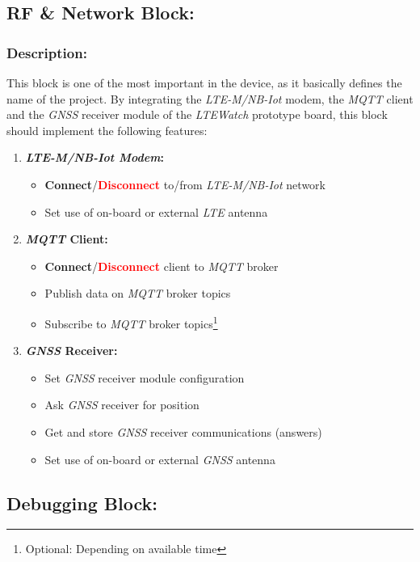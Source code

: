 \documentclass[report.tex]{subfiles}
\begin{document}
\subsection{RF \& Network Block:}
\subsubsection{Description:}
This block is one of the most important in the device, as it basically defines the name of the project. By integrating the \textit{LTE-M/NB-Iot} modem, the \textit{MQTT} client and the \textit{GNSS} receiver module of the \textit{LTEWatch} prototype board, this block should implement the following features:

\begin{enumerate}
\item \textbf{\textit{LTE-M/NB-Iot Modem}:}
\begin{itemize}
\item \textbf{\textcolor{mygreen}{Connect}}/\textbf{\textcolor{red}{Disconnect}} to/from \textit{LTE-M/NB-Iot} network
\item Set use of on-board or external \textit{LTE} antenna
\end{itemize}
\item \textbf{\textit{MQTT} Client:}
\begin{itemize}
\item \textbf{\textcolor{mygreen}{Connect}}/\textbf{\textcolor{red}{Disconnect}} client to \textit{MQTT} broker
\item Publish data on \textit{MQTT} broker topics
\item Subscribe to \textit{MQTT} broker topics\footnote{Optional: Depending on available time}
\end{itemize}
\item \textbf{\textit{GNSS} Receiver:}
\begin{itemize}
\item Set \textit{GNSS} receiver module configuration
\item Ask \textit{GNSS} receiver for position
\item Get and store \textit{GNSS} receiver communications (answers)
\item Set use of on-board or external \textit{GNSS} antenna
\end{itemize}
\end{enumerate}

\subsection{Debugging Block:}
\end{document}
